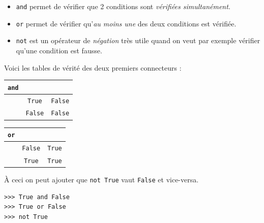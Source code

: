\begin{itemize}
	\item   \texttt{and} permet de vérifier que 2 conditions sont \textit{vérifiées simultanément}.
	\item   \texttt{or} permet de vérifier qu'\textit{au moins une} des deux conditions est vérifiée.
	\item   \texttt{not} est un opérateur de \textit{négation} très utile quand on veut par exemple vérifier qu'une condition est fausse.
\end{itemize}
Voici les tables de vérité des deux premiers connecteurs :
\begin{center}
	\begin{tabular}{|c|c|c|}
		\hline
		\texttt{and} &\cellcolor{UGLiOrange}{\boxfont\color{white}True}       & \cellcolor{UGLiOrange}{\boxfont\color{white}False}       \\
		\hline
		\cellcolor{UGLiOrange}{\boxfont\color{white}True}      & \texttt{True}  & \texttt{False} \\
		\hline
		\cellcolor{UGLiOrange}{\boxfont\color{white}False}     & \texttt{False} & \texttt{False} \\
		\hline
	\end{tabular}\hspace{2em}
	\begin{tabular}{|c|c|c|}
		\hline
		\texttt{or} &\cellcolor{UGLiOrange}{\boxfont\color{white}True}       & \cellcolor{UGLiOrange}{\boxfont\color{white}False}       \\
		\hline
		\cellcolor{UGLiOrange}{\boxfont\color{white}True}      & \texttt{False}  & \texttt{True} \\
		\hline
		\cellcolor{UGLiOrange}{\boxfont\color{white}False}     & \texttt{True} & \texttt{True} \\
		\hline
	\end{tabular}
\end{center}
À ceci on peut ajouter que \texttt{not True} vaut \texttt{False} et vice-versa.

\begin{pys}
	\begin{verbatim}
>>> True and False
>>> True or False
>>> not True
    \end{verbatim}
\end{pys}

